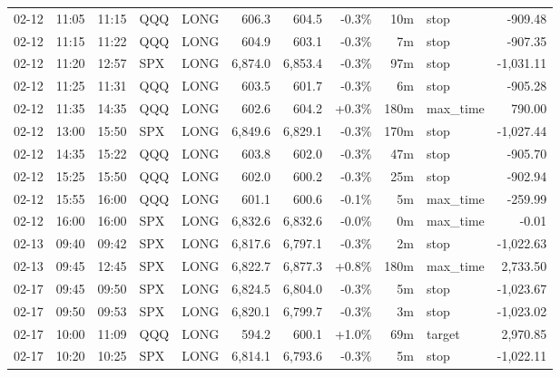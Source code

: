 \documentclass[11pt,a4paper,twoside]{article}
\begin{document}
\begin{center}
\begin{longtable}{>{\color{txtmain}}l l l l l r r r r >{\color{txtmain}}l r}
02-12 & 11:05 & 11:15 & QQQ & LONG & 606.3 & 604.5 & \textcolor{lossred}{-0.3\%} & 10m & stop & \textcolor{lossred}{-909.48} \\
02-12 & 11:15 & 11:22 & QQQ & LONG & 604.9 & 603.1 & \textcolor{lossred}{-0.3\%} & 7m & stop & \textcolor{lossred}{-907.35} \\
02-12 & 11:20 & 12:57 & SPX & LONG & 6,874.0 & 6,853.4 & \textcolor{lossred}{-0.3\%} & 97m & stop & \textcolor{lossred}{-1,031.11} \\
02-12 & 11:25 & 11:31 & QQQ & LONG & 603.5 & 601.7 & \textcolor{lossred}{-0.3\%} & 6m & stop & \textcolor{lossred}{-905.28} \\
02-12 & 11:35 & 14:35 & QQQ & LONG & 602.6 & 604.2 & \textcolor{wingreen}{+0.3\%} & 180m & max\_time & \textcolor{wingreen}{790.00} \\
02-12 & 13:00 & 15:50 & SPX & LONG & 6,849.6 & 6,829.1 & \textcolor{lossred}{-0.3\%} & 170m & stop & \textcolor{lossred}{-1,027.44} \\
02-12 & 14:35 & 15:22 & QQQ & LONG & 603.8 & 602.0 & \textcolor{lossred}{-0.3\%} & 47m & stop & \textcolor{lossred}{-905.70} \\
02-12 & 15:25 & 15:50 & QQQ & LONG & 602.0 & 600.2 & \textcolor{lossred}{-0.3\%} & 25m & stop & \textcolor{lossred}{-902.94} \\
02-12 & 15:55 & 16:00 & QQQ & LONG & 601.1 & 600.6 & \textcolor{lossred}{-0.1\%} & 5m & max\_time & \textcolor{lossred}{-259.99} \\
02-12 & 16:00 & 16:00 & SPX & LONG & 6,832.6 & 6,832.6 & \textcolor{lossred}{-0.0\%} & 0m & max\_time & \textcolor{lossred}{-0.01} \\
02-13 & 09:40 & 09:42 & SPX & LONG & 6,817.6 & 6,797.1 & \textcolor{lossred}{-0.3\%} & 2m & stop & \textcolor{lossred}{-1,022.63} \\
02-13 & 09:45 & 12:45 & SPX & LONG & 6,822.7 & 6,877.3 & \textcolor{wingreen}{+0.8\%} & 180m & max\_time & \textcolor{wingreen}{2,733.50} \\
02-17 & 09:45 & 09:50 & SPX & LONG & 6,824.5 & 6,804.0 & \textcolor{lossred}{-0.3\%} & 5m & stop & \textcolor{lossred}{-1,023.67} \\
02-17 & 09:50 & 09:53 & SPX & LONG & 6,820.1 & 6,799.7 & \textcolor{lossred}{-0.3\%} & 3m & stop & \textcolor{lossred}{-1,023.02} \\
02-17 & 10:00 & 11:09 & QQQ & LONG & 594.2 & 600.1 & \textcolor{wingreen}{+1.0\%} & 69m & target & \textcolor{wingreen}{2,970.85} \\
02-17 & 10:20 & 10:25 & SPX & LONG & 6,814.1 & 6,793.6 & \textcolor{lossred}{-0.3\%} & 5m & stop & \textcolor{lossred}{-1,022.11} \\

\end{longtable}
\end{center}
\end{document}
